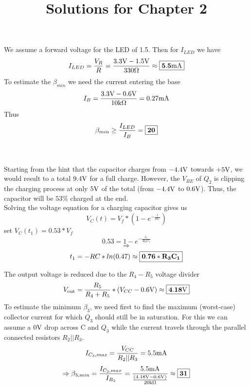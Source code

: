 \documentclass{article}
\begin{document}
\title{Solutions for Chapter 2}

	We assume a forward voltage for the LED of 1.5\V. Then for $I_{LED}$ we have
	\[I_{LED} = \frac{V_R}{R} = \frac{3.3\text{V} - 1.5\text{V}}{330\Omega} \approx \boxed{\mathbf{5.5\text{m}\text{A}}}\]
	To estimate the $\beta_{min}$ we need the current entering the base
	\[I_B = \frac{3.3\text{V} - 0.6\text{V}}{10\text{k}\Omega} = 0.27\text{m}\text{A} \]
	Thus
	\[\beta_{min} \geq \frac{I_{LED}}{I_B} = \boxed{\mathbf{20}}\]
	
	
	\\\\
	Starting from the hint that the capacitor charges from $-4.4\text{V}$ towards $+5\text{V}$, we would result to a total $9.4\text{V}$ for a full charge. However, the $V_{BE}$ of $Q_2$ is clipping the charging process at only $5\text{V}$ of the total (from $-4.4\text{V}$ to $0.6\text{V}$). Thus, the capacitor will be $53\%$ charged at the end. \\Solving the voltage equation for a charging capacitor gives us
	\[V_C(t) = V_f * (1 - e^{-\frac{t}{R C}})\]
	set $V_C(t_1) = 0.53 * V_f$
	\[0.53 = 1 - e^{-\frac{t_1}{R_3 C_1}}\]
	\[\Rightarrow\]
	\[t_1 = - R C*ln(0.47) \approx \boxed{\mathbf{0.76 * R_3 C_1}}\]
	
	
	The output voltage is reduced due to the $R_4 - R_5$ voltage divider
	\[V_{\text{out}} = \frac{R_5}{R_4 + R_5} * (V_{CC} - 0.6\text{V}) \approx \boxed{\mathbf{4.18\text{V}}}\]
	To estimate the minimum $\beta_3$, we need first to find the maximum (worst-case) collector current for which $Q_3$ should still be in saturation. For this we can assume a $0\text{V}$ drop across C and $Q_3$ while the current travels through the parallel connected resistors $R_2||R_3$.
	\[I_{C_3,max} = \frac{V_{CC}}{R_2||R_3} = 5.5\text{m}\text{A}\]
	\[\Rightarrow \beta_{3,min} = \frac{I_{C_3,max}}{I_{B_3}} = \frac{5.5\text{m}\text{A}}{\frac{(4.18\text{V} - 0.6\text{V})} {20\text{k}\Omega}} \approx \boxed{\mathbf{31}}\]
\end{document}
